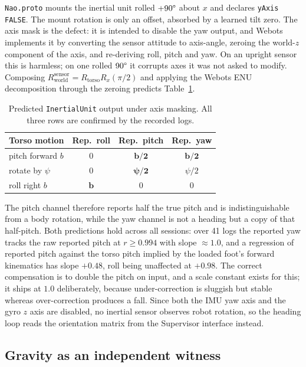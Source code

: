 \documentclass[twocolumn]{article}
\begin{document}
\texttt{Nao.proto} mounts the inertial unit rolled $+90\degree$ about $x$ and declares
\texttt{yAxis FALSE}. The mount rotation is only an offset, absorbed by a learned tilt zero.
The axis mask is the defect: it is intended to disable the yaw output, and Webots implements it
by converting the sensor attitude to axis-angle, zeroing the world-$z$ component of the axis,
and re-deriving roll, pitch and yaw. On an upright sensor this is harmless; on one rolled
$90\degree$ it corrupts axes it was not asked to modify. Composing
$R^{\text{sensor}}_{\text{world}} = R_{\text{torso}} R_x(\pi/2)$ and applying the Webots ENU
decomposition through the zeroing predicts Table~\ref{tab:imupath}.

\begin{table}[H]
\centering
\caption{Predicted \texttt{InertialUnit} output under axis masking. All three rows are
confirmed by the recorded logs.}
\label{tab:imupath}
\small
\begin{tabular}{@{}lccc@{}}
\toprule
Torso motion & Rep.\ roll & Rep.\ pitch & Rep.\ yaw \\
\midrule
pitch forward $b$ & $0$ & $\mathbf{b/2}$ & $\mathbf{b/2}$ \\
rotate by $\psi$ & $0$ & $\boldsymbol{\psi/2}$ & $\psi/2$ \\
roll right $b$ & $\mathbf{b}$ & $0$ & $0$ \\
\bottomrule
\end{tabular}
\end{table}

The pitch channel therefore reports half the true pitch and is indistinguishable from a body
rotation, while the yaw channel is not a heading but a copy of that half-pitch. Both
predictions hold across all sessions: over 41 logs the reported yaw tracks the raw reported
pitch at $r \ge 0.994$ with slope $\approx 1.0$, and a regression of reported pitch against the
torso pitch implied by the loaded foot's forward kinematics has slope $+0.48$, roll being
unaffected at $+0.98$. The correct compensation is to double the pitch on input, and a scale
constant exists for this; it ships at $1.0$ deliberately, because under-correction is sluggish
but stable whereas over-correction produces a fall. Since both the IMU yaw axis and the gyro
$z$ axis are disabled, no inertial sensor observes robot rotation, so the heading loop reads
the orientation matrix from the Supervisor interface instead.

\subsection{Gravity as an independent witness}
\label{sec:acc}
\end{document}
